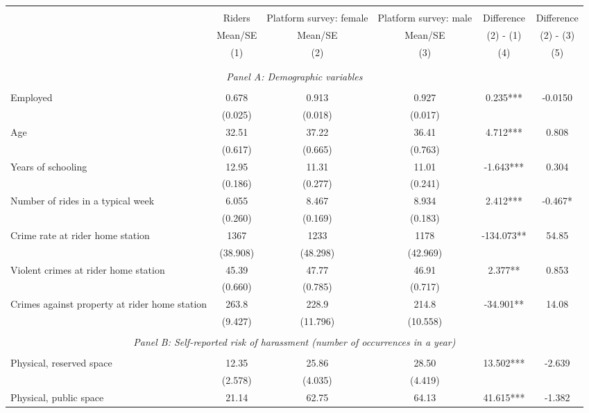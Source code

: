 


\begin{tabular}{lccccc} \hline\hline \\[-1.8ex]
 & Riders & Platform survey: female & Platform survey: male & Difference & Difference \\
 & Mean/SE & Mean/SE & Mean/SE & (2) - (1) & (2) - (3) \\
 & (1) & (2) & (3) & (4) & (5) \\ \hline \\[-1.8ex] \\[-1ex] \multicolumn{6}{c}{\textit{Panel A: Demographic variables}} \\[-1ex] \\
Employed & 0.678 & 0.913 & 0.927 & 0.235*** & -0.0150 \\
 & (0.025) & (0.018) & (0.017) &  &  \\
Age & 32.51 & 37.22 & 36.41 & 4.712*** & 0.808 \\
 & (0.617) & (0.665) & (0.763) &  &  \\
Years of schooling & 12.95 & 11.31 & 11.01 & -1.643*** & 0.304 \\
 & (0.186) & (0.277) & (0.241) &  &  \\
Number of rides in a typical week & 6.055 & 8.467 & 8.934 & 2.412*** & -0.467* \\
 & (0.260) & (0.169) & (0.183) &  &  \\
Crime rate at rider home station & 1367 & 1233 & 1178 & -134.073** & 54.85 \\
 & (38.908) & (48.298) & (42.969) &  &  \\
Violent crimes at rider home station & 45.39 & 47.77 & 46.91 & 2.377** & 0.853 \\
 & (0.660) & (0.785) & (0.717) &  &  \\
Crimes against property at rider home station & 263.8 & 228.9 & 214.8 & -34.901** & 14.08 \\
 & (9.427) & (11.796) & (10.558) &  &  \\
\\[-1ex] \multicolumn{6}{c}{\textit{Panel B: Self-reported risk of harassment (number of occurrences in a year)}} \\ \\[-1ex] Physical, reserved space & 12.35 & 25.86 & 28.50 & 13.502*** & -2.639 \\
 & (2.578) & (4.035) & (4.419) &  &  \\
Physical, public space & 21.14 & 62.75 & 64.13 & 41.615*** & -1.382 \\

\end{tabular}
